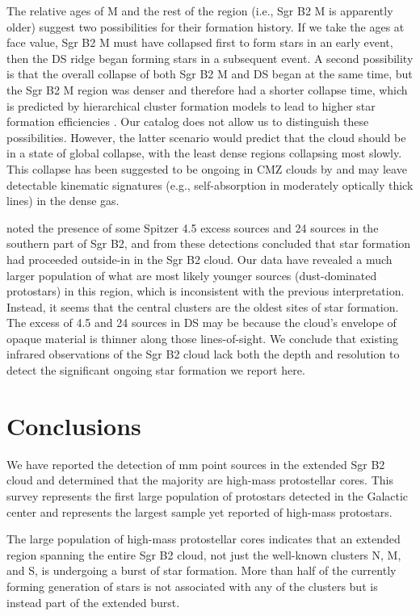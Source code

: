 \documentclass[twocolumn]{aastex61}
\begin{document}
The relative ages of M and the rest of the region (i.e., Sgr B2 M is apparently
older) suggest two possibilities for their formation history.  If we take the
ages at face value, Sgr B2 M must have collapsed first to form stars in an
early event, then the DS ridge began forming stars in a
subsequent event.  A second possibility is that the overall collapse of both Sgr B2
M and DS began at the same time, but the Sgr B2 M region was denser and
therefore had a shorter collapse time, which is predicted by hierarchical
cluster formation models to lead to higher star formation efficiencies
\citep{Kruijssen2012a}.  Our catalog does not allow us to distinguish these
possibilities.  However, the latter scenario would predict that the cloud
should be in a state of global collapse, with the least dense regions
collapsing most slowly.  This collapse has been suggested to be ongoing in CMZ
clouds by \citet{Walker2015a,Walker2016a} and may leave detectable kinematic
signatures (e.g., self-absorption in moderately optically thick lines) in the
dense gas.


\citet{Yusef-Zadeh2009a} noted the presence of some Spitzer 4.5 \um excess
sources and 24 \um sources in the southern part of Sgr B2, and from these
detections concluded that star formation had proceeded outside-in in the Sgr B2
cloud.  Our data have revealed a much larger population of what are most likely
younger sources (dust-dominated protostars) in this region, which is
inconsistent with the previous interpretation.  Instead, it seems that the
central clusters are the oldest sites of star formation.  The excess of 4.5 \um
and 24 \um sources in DS may be because the cloud's envelope of opaque material
is thinner along those lines-of-sight.  We conclude that existing infrared
observations of the Sgr B2 cloud lack both the depth and resolution to detect
the significant ongoing star formation we report here.

\section{Conclusions}
\label{sec:conclusions}
We have reported the detection of  mm point sources in the extended
Sgr B2 cloud and determined that the majority are high-mass protostellar
cores.  This survey represents the first large population of protostars
detected in the Galactic center and represents the largest sample yet reported
of high-mass protostars.

The large population of high-mass protostellar cores indicates that an extended
region spanning the entire Sgr B2 cloud, not just the well-known clusters N, M,
and S, is undergoing a burst of star formation.  More than half of the
currently forming generation of stars is not associated with any of the
clusters but is instead part of the extended burst.
\end{document}
